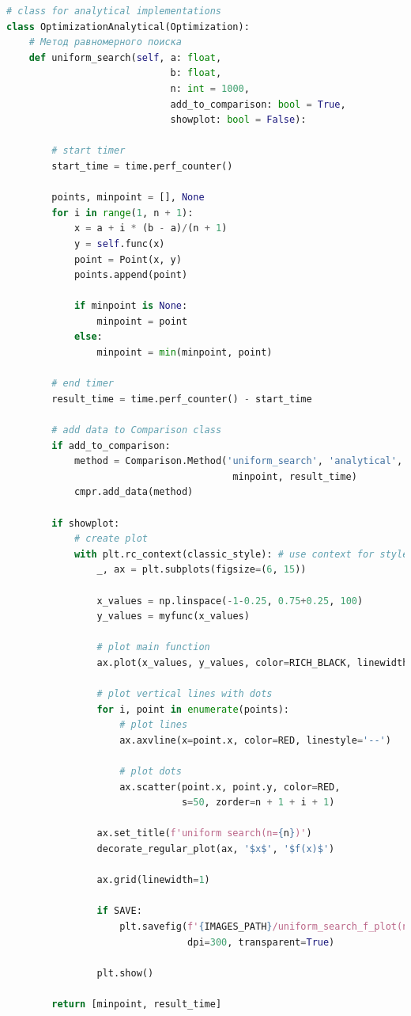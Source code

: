 \documentclass[a4paper, 14pt]{extarticle}
\begin{document}
\begin{center}
    \begin{lstlisting}[language=Python]
# class for analytical implementations
class OptimizationAnalytical(Optimization):
    # Метод равномерного поиска
    def uniform_search(self, a: float, 
                             b: float,
                             n: int = 1000,
                             add_to_comparison: bool = True,
                             showplot: bool = False):
        
        # start timer
        start_time = time.perf_counter()

        points, minpoint = [], None
        for i in range(1, n + 1):
            x = a + i * (b - a)/(n + 1)
            y = self.func(x)
            point = Point(x, y)
            points.append(point)

            if minpoint is None:
                minpoint = point
            else:
                minpoint = min(minpoint, point)

        # end timer
        result_time = time.perf_counter() - start_time

        # add data to Comparison class
        if add_to_comparison:
            method = Comparison.Method('uniform_search', 'analytical', 
                                        minpoint, result_time)
            cmpr.add_data(method)

        if showplot:
            # create plot 
            with plt.rc_context(classic_style): # use context for styles not to interfere
                _, ax = plt.subplots(figsize=(6, 15))

                x_values = np.linspace(-1-0.25, 0.75+0.25, 100)
                y_values = myfunc(x_values)

                # plot main function
                ax.plot(x_values, y_values, color=RICH_BLACK, linewidth=3)

                # plot vertical lines with dots
                for i, point in enumerate(points):
                    # plot lines
                    ax.axvline(x=point.x, color=RED, linestyle='--')

                    # plot dots
                    ax.scatter(point.x, point.y, color=RED, 
                               s=50, zorder=n + 1 + i + 1)

                ax.set_title(f'uniform search(n={n})')
                decorate_regular_plot(ax, '$x$', '$f(x)$')

                ax.grid(linewidth=1)

                if SAVE:
                    plt.savefig(f'{IMAGES_PATH}/uniform_search_f_plot(n={n}).png', 
                                dpi=300, transparent=True)

                plt.show()

        return [minpoint, result_time]
    \end{lstlisting}
\end{center}
\end{document}
